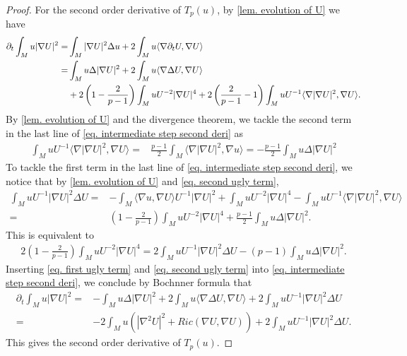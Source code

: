 \documentclass[11pt]{amsart}
\numberwithin{equation}{section}
\numberwithin{lemma}{section}
\numberwithin{proposition}{section}
\numberwithin{corollary}{section}
\numberwithin{remark}{section}
\begin{document}
\begin{proof}
    For the second order derivative of $T_p(u)$, by \cref{lem. evolution of U} we have
    \begin{align}\label{eq. intermediate step second deri}
        \partial_t\int_M u|\nabla U|^2
        =&\int_M |\nabla U|^2\Delta u
        +2\int_M u\langle\nabla \partial_tU,\nabla U\rangle\notag\\
        =&\int_M u\Delta |\nabla U|^2
        +2\int_M u\langle\nabla \Delta U,\nabla U\rangle\notag\\
        &+2\left(1-\frac{2}{p-1}\right)\int_M uU^{-2}|\nabla U|^4
        +2\left(\frac{2}{p-1}-1\right)\int_M uU^{-1}\langle\nabla|\nabla U|^2,\nabla U\rangle.
    \end{align}
    By \cref{lem. evolution of U} and the divergence theorem, we tackle the second term in the last line of \cref{eq. intermediate step second deri} as
    \begin{align}\label{eq. second ugly term}
        \int_M uU^{-1}\langle\nabla |\nabla U|^2,\nabla U\rangle
        =&\frac{p-1}{2}\int_M \langle\nabla|\nabla U|^2,\nabla u\rangle
        =-\frac{p-1}{2}\int_M u\Delta |\nabla U|^2
    \end{align}
    To tackle the first term in the last line of \cref{eq. intermediate step second deri},  we notice that by \cref{lem. evolution of U} and \cref{eq. second ugly term},
    \begin{align*}
        \int_M uU^{-1}|\nabla U|^2\Delta U
        =&-\int_M \langle\nabla u,\nabla U\rangle U^{-1}|\nabla U|^2
        +\int_M uU^{-2}|\nabla U|^4
        -\int_M uU^{-1}\langle\nabla |\nabla U|^2,\nabla U\rangle\\
        =&\left(1-\frac{2}{p-1}\right)\int_M uU^{-2}|\nabla U|^4
        +\frac{p-1}{2}\int_M u\Delta|\nabla U|^2.
    \end{align*}
    This is equivalent to
    \begin{align}\label{eq. first ugly term}
        2\left(1-\frac{2}{p-1}\right)\int_M uU^{-2}|\nabla U|^4
        =2\int_M uU^{-1}|\nabla U|^2\Delta U
        -(p-1)\int_M u\Delta |\nabla U|^2.
    \end{align}
    Inserting \cref{eq. first ugly term} and \cref{eq. second ugly term} into \cref{eq. intermediate step second deri}, we conclude by Bochnner formula that
    \begin{align*}
        \partial_t\int_M u|\nabla U|^2
        =&-\int_M u\Delta |\nabla U|^2
        +2\int_M u\langle\nabla \Delta U,\nabla U\rangle
        +2\int_M uU^{-1}|\nabla U|^2\Delta U\\
        =&-2\int_M u(|\nabla^2 U|^2+Ric(\nabla U,\nabla U))
        +2\int_M uU^{-1}|\nabla U|^2\Delta U.
    \end{align*}
    This gives the second order derivative of $T_p(u)$.
\end{proof}
\end{document}
